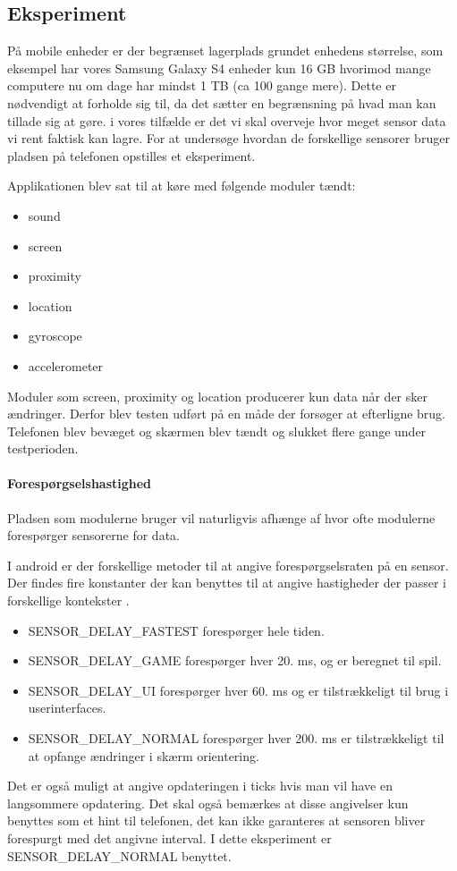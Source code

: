 \subsection{Eksperiment}

På mobile enheder er der begrænset lagerplads grundet enhedens størrelse, som eksempel har vores Samsung Galaxy S4 enheder kun 16 GB hvorimod mange computere nu om dage har mindst 1 TB (ca 100 gange mere).
Dette er nødvendigt at forholde sig til, da det sætter en begrænsning på hvad man kan tillade sig at gøre.
i vores tilfælde er det vi skal overveje hvor meget sensor data vi rent faktisk kan lagre.
For at undersøge hvordan de forskellige sensorer bruger pladsen på telefonen opstilles et eksperiment.

Applikationen blev sat til at køre med følgende moduler tændt:
\begin{itemize}
	\item sound
	\item screen
	\item proximity
	\item location
	\item gyroscope
	\item accelerometer
\end{itemize}

Moduler som screen, proximity og location producerer kun data når der sker ændringer. 
Derfor blev testen udført på en måde der forsøger at efterligne brug. 
Telefonen blev bevæget og skærmen blev tændt og slukket flere gange under testperioden.

\paragraph{Forespørgselshastighed}
Pladsen som modulerne bruger vil naturligvis afhænge af hvor ofte modulerne forespørger sensorerne for data.

I android er der forskellige metoder til at angive forespørgselsraten på en sensor.
Der findes fire konstanter der kan benyttes til at angive hastigheder der passer i forskellige kontekster \cite{sensormonitor}.

\begin{itemize}
	\item SENSOR\_DELAY\_FASTEST forespørger hele tiden.
	\item SENSOR\_DELAY\_GAME forespørger hver 20. ms, og er beregnet til spil.
	\item SENSOR\_DELAY\_UI forespørger hver 60. ms og er tilstrækkeligt til brug i userinterfaces.
	\item SENSOR\_DELAY\_NORMAL forespørger hver 200. ms er tilstrækkeligt til at opfange ændringer i skærm orientering.
\end{itemize}
Det er også muligt at angive opdateringen i ticks hvis man vil have en langsommere opdatering.
Det skal også bemærkes at disse angivelser kun benyttes som et hint til telefonen, det kan ikke garanteres at sensoren bliver forespurgt med det angivne interval.
I dette eksperiment er SENSOR\_DELAY\_NORMAL benyttet.


